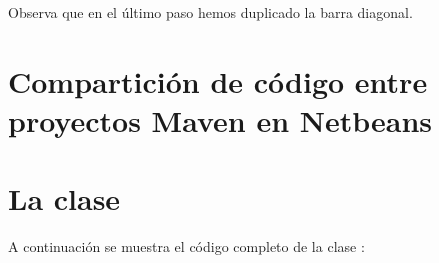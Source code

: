 \documentclass[letterpaper,10pt,spanish]{sphinxmanual}
\begin{document}
Observa que en el último paso hemos duplicado la barra diagonal.


\section{Compartición de código entre proyectos Maven en Netbeans}
\label{\detokenize{textos/anexos:comparticion-de-codigo-entre-proyectos-maven-en-netbeans}}

\section{La clase }
\label{\detokenize{textos/anexos:la-clase-utilidadesficheros}}
A continuación se muestra el código completo de la clase :
\end{document}
